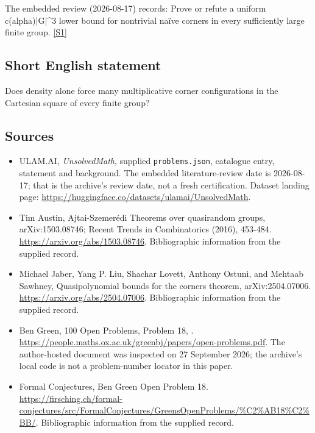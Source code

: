 \documentclass[11pt,a4paper]{article}
\newcommand{\sref}[2]{\hyperlink{source:#1:#2}{[S#2]}}
\begin{document}
The embedded review (2026-08-17) records: Prove or refute a uniform c(alpha)|G|\textasciicircum{}3 lower bound for nontrivial naïve corners in every sufficiently large finite group. \sref{statement}{1}

\subsection{Short English statement}

Does density alone force many multiplicative corner configurations in the Cartesian square of every finite group?

\subsection{Sources}

{\small

\begin{itemize}

\item[\hypertarget{source:statement:1}{S1}] ULAM.AI, \emph{UnsolvedMath}, supplied \texttt{problems.json}, catalogue entry, statement and background. The embedded literature-review date is 2026-08-17; that is the archive’s review date, not a fresh certification. Dataset landing page: \url{https://huggingface.co/datasets/ulamai/UnsolvedMath}.

\item[\hypertarget{source:statement:2}{S2}] Tim Austin, Ajtai-Szemerédi Theorems over quasirandom groups, arXiv:1503.08746; Recent Trends in Combinatorics (2016), 453-484. \url{https://arxiv.org/abs/1503.08746}. Bibliographic information from the supplied record.

\item[\hypertarget{source:statement:3}{S3}] Michael Jaber, Yang P. Liu, Shachar Lovett, Anthony Ostuni, and Mehtaab Sawhney, Quasipolynomial bounds for the corners theorem, arXiv:2504.07006. \url{https://arxiv.org/abs/2504.07006}. Bibliographic information from the supplied record.

\item[\hypertarget{source:statement:4}{S4}] Ben Green, 100 Open Problems, Problem 18, . \url{https://people.maths.ox.ac.uk/greenbj/papers/open-problems.pdf}. The author-hosted document was inspected on 27 September 2026; the archive’s local code is not a problem-number locator in this paper.

\item[\hypertarget{source:statement:5}{S5}] Formal Conjectures, Ben Green Open Problem 18. \url{https://firsching.ch/formal-conjectures/src/FormalConjectures/GreensOpenProblems/%C2%AB18%C2%BB/}. Bibliographic information from the supplied record.

\end{itemize}

}

\label{end:statement}
\end{document}
